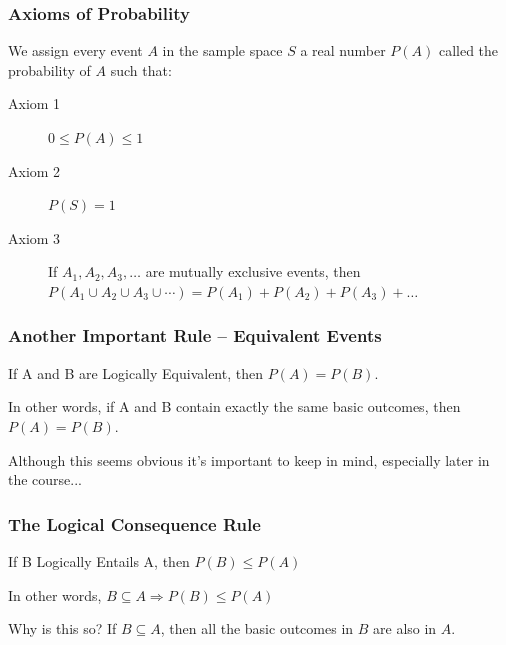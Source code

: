 \documentclass{beamer}
\begin{document}

\begin{frame}
\frametitle{Axioms of Probability}
We assign every event $A$ in the sample space $S$ a real number $P(A)$ called the \alert{probability of $A$} such that: 
\vspace{1em}
\begin{description}
	\item[Axiom 1] $0 \leq P(A) \leq 1$
	\item[Axiom 2] $P(S)=1$
	\item[Axiom 3] If $A_1, A_2, A_3, \hdots$ are mutually exclusive events, then $P(A_1\cup A_2 \cup A_3 \cup \cdots) = P(A_1) + P(A_2) + P(A_3) + \hdots$
\end{description}

\end{frame}

\begin{frame}
\frametitle{Another Important Rule -- Equivalent Events}

\begin{block}{If A and B are Logically Equivalent, then $P(A) = P(B)$.}\end{block}

\begin{alertblock}{In other words, if A and B contain exactly the same basic outcomes, then $P(A) = P(B)$.}\end{alertblock}

Although this seems obvious it's important to keep in mind, especially later in the course...
\end{frame}
\begin{frame}
\frametitle{The Logical Consequence Rule}

\begin{block}{If B Logically Entails A, then $P(B)\leq P(A)$}\end{block}

\begin{alertblock}{In other words, $B\subseteq A \Rightarrow P(B)\leq P(A)$}\end{alertblock}


\begin{block}{Why is this so?}
If $B \subseteq A$, then all the basic outcomes in $B$ are also in $A$.
\end{block}

\end{frame}
\end{document}
